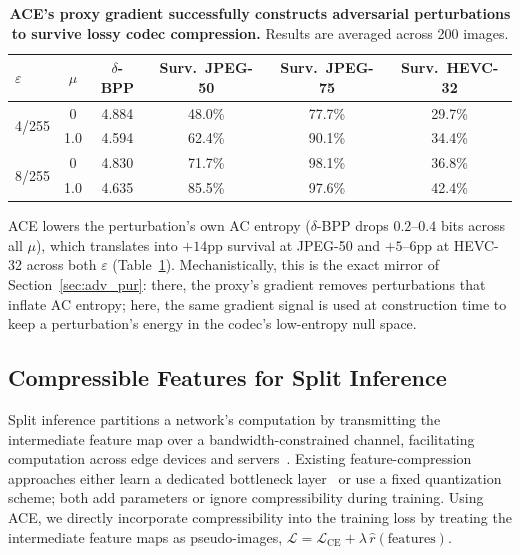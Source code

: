 \begin{table}[h]
  \centering
  \small
  \caption{
  \textbf{ACE's proxy gradient successfully constructs adversarial perturbations to survive lossy codec compression.}
  Results are averaged across 200 images.}
  \label{tab:survival}
  \begin{tabular}{lccccc}
    \toprule
    $\varepsilon$ & $\mu$ & $\delta$-BPP & Surv.\ JPEG-50 & Surv.\ JPEG-75 & Surv.\ HEVC-32 \\
    \midrule
    \multirow{2}{*}{4/255}
      & 0 & 4.884 & 48.0\% & 77.7\% & 29.7\% \\
      & 1.0              & 4.594 & 62.4\% & 90.1\% & 34.4\% \\
      \midrule
    \multirow{2}{*}{8/255}
      & 0 & 4.830 & 71.7\% & 98.1\% & 36.8\% \\
      & 1.0              & 4.635 & 85.5\% & 97.6\% & 42.4\% \\
    \bottomrule
  \end{tabular}
\end{table}

ACE lowers the perturbation's own AC entropy ($\delta$-BPP drops $0.2$--$0.4$ bits across all $\mu$), which translates into $+14$pp survival at JPEG-50 and $+5$--$6$pp at HEVC-32 across both $\varepsilon$ (Table~\ref{tab:survival}).
Mechanistically, this is the exact mirror of Section~\ref{sec:adv_pur}: there, the proxy's gradient removes perturbations that inflate AC entropy; here, the same gradient signal is used at construction time to keep a perturbation's energy in the codec's low-entropy null space.

\subsection{Compressible Features for Split Inference}
\label{sec:split}

Split inference partitions a network's computation by transmitting the intermediate feature map over a bandwidth-constrained channel, facilitating computation across edge devices and servers~\citep{kang2017neurosurgeon}.
Existing feature-compression approaches either learn a dedicated bottleneck layer~\citep{shi2019bottlenet} or use a fixed quantization scheme; both add parameters or ignore compressibility during training.
Using ACE, we directly incorporate compressibility into the training loss by treating the intermediate feature maps as pseudo-images, $\mathcal{L} = \mathcal{L}_{\text{CE}} + \lambda\,\hat{r}(\text{features})$.

